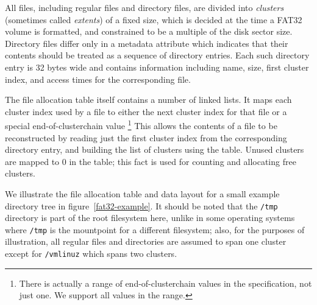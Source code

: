 \documentclass[submission,copyright,creativecommons]{eptcs}
\begin{document}
All files, including regular files and directory files, are divided into
\textit{clusters} (sometimes called \textit{extents}) of a fixed size,
which is decided at the time a FAT32 volume is formatted, and
constrained to be a multiple of the disk sector size. Directory files
differ only in a metadata attribute which indicates that their contents
should be treated as a sequence of directory entries. Each such
directory entry is 32 bytes wide and contains information including
name, size, first cluster index, and access times for the
corresponding file.

The file allocation table itself contains a number of linked lists. It
maps each cluster index used by a file to either the next cluster
index for that file or a special end-of-clusterchain value \footnote{
There is actually a range of end-of-clusterchain values in the
specification, not just one. We support all values in the range.} This
allows the contents of a file to be reconstructed by
reading just the first cluster index from the corresponding directory
entry, and building the list of clusters using the table. Unused
clusters are mapped to 0 in the table; this fact is used for counting
and allocating free clusters.

We illustrate the file allocation table and data layout for a small
example directory tree in figure~\ref{fat32-example}. It should be
noted that the \texttt{/tmp} directory is part of the root filesystem
here, unlike in some operating systems where \texttt{/tmp} is the
mountpoint for a different filesystem; also, for the purposes of
illustration, all regular files and directories are assumed to span
one cluster except for \texttt{/vmlinuz} which spans two clusters.
\end{document}

